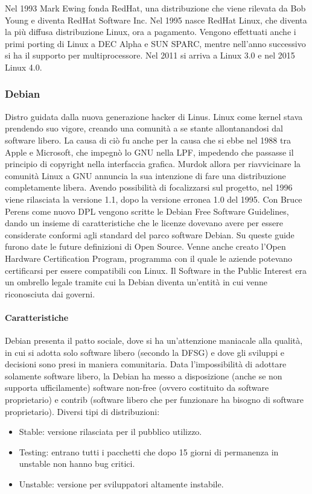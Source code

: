 Nel 1993 Mark Ewing fonda RedHat, una distribuzione che viene rilevata da Bob Young e diventa RedHat Software Inc. Nel 1995 nasce RedHat Linux, che diventa la pi\`u diffusa distribuzione Linux, ora a pagamento. Vengono effettuati anche i primi porting di Linux a DEC Alpha e SUN SPARC, mentre nell'anno successivo si ha il supporto per multiprocessore. Nel 2011 si arriva a Linux 3.0 e nel 2015 Linux 4.0.

\subsubsection{Debian}

Distro guidata dalla nuova generazione hacker di Linus. Linux come kernel stava prendendo suo vigore, creando una comunit\`a a se stante allontanandosi dal software libero. La causa di ci\`o fu anche per la causa che si ebbe nel 1988 tra Apple e Microsoft, che impegn\`o lo GNU nella LPF, impedendo che passasse il principio di copyright nella interfaccia grafica. Murdok allora per riavvicinare la comunit\`a Linux a GNU annuncia la sua intenzione di fare una distribuzione completamente libera. Avendo possibilit\`a di focalizzarsi sul progetto, nel 1996 viene rilasciata la versione 1.1, dopo la versione erronea 1.0 del 1995. Con Bruce Perens come nuovo DPL vengono scritte le Debian Free Software Guidelines, dando un insieme di caratteristiche che le licenze dovevano avere per essere considerate conformi agli standard del parco software Debian. Su queste guide furono date le future definizioni di Open Source. Venne anche creato l'Open Hardware Certification Program, programma con il quale le aziende potevano certificarsi per essere compatibili con Linux. Il Software in the Public Interest era un ombrello legale tramite cui la Debian diventa un'entit\`a in cui venne riconosciuta dai governi.

\paragraph*{Caratteristiche} Debian presenta il patto sociale, dove si ha un'attenzione maniacale alla qualit\`a, in cui si adotta solo software libero (secondo la DFSG) e dove gli sviluppi e decisioni sono presi in maniera comunitaria. Data l'impossibilit\`a di adottare solamente software libero, la Debian ha messo a disposizione (anche se non supporta ufficilamente) software non-free (ovvero costituito da software proprietario) e contrib (software libero che per funzionare ha bisogno di software proprietario). Diversi tipi di distribuzioni:
\begin{itemize}
  
\item Stable: versione rilasciata per il pubblico utilizzo.
\item Testing: entrano tutti i pacchetti che dopo 15 giorni di permanenza in unstable non hanno bug critici.
\item Unstable: versione per sviluppatori altamente instabile.

\end{itemize}


